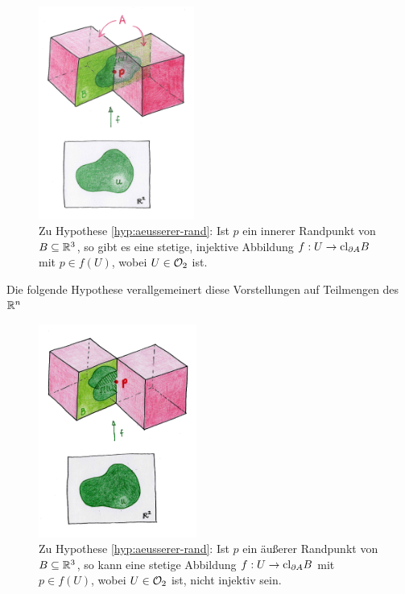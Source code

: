     \begin{figure}[ht]
        \centering
        \includegraphics[height=7cm]{abb/pflasterbild-innerer-rp.png}
        \caption[Zu Hypothese \ref{hyp:aeusserer-rand} (innerer Randpunkt)]{Zu Hypothese \ref{hyp:aeusserer-rand}: Ist $p$ ein innerer Randpunkt von $B \subseteq \mathbb{R}^3$, so gibt es eine stetige, injektive Abbildung $f:U \to \text{cl}_{\partial A} B$ mit $p \in f(U)$, wobei $U \in \mathcal{O}_2$ ist.}
        \label{fig:pflasterbild-innerer-rp}
    \end{figure}
    
    
    Die
    folgende Hypothese verallgemeinert diese Vorstellungen auf Teilmengen des $\mathbb{R}^n$

    \begin{figure}[ht]
        \centering
        \includegraphics[height=7cm]{abb/pflasterbild-aeusserer-rp.png}
        \caption[Zu Hypothese \ref{hyp:aeusserer-rand} (äußerer Randpunkt)]{Zu Hypothese \ref{hyp:aeusserer-rand}: Ist $p$ ein äußerer Randpunkt von $B \subseteq \mathbb{R}^3$, so kann eine stetige Abbildung $f:U \to \text{cl}_{\partial A} B$ mit $p \in f(U)$, wobei $U \in \mathcal{O}_2$ ist, nicht injektiv sein.}
        \label{fig:pflasterbild-aeusserer-rp}
    \end{figure}
    
